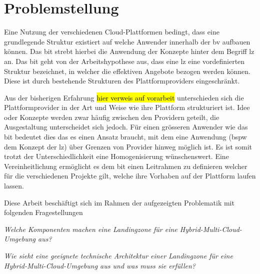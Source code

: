 \section{Problemstellung}

Eine Nutzung der verschiedenen Cloud-Plattformen bedingt, dass eine grundlegende Struktur existiert auf welche Anwender innerhalb der \ac{bv} aufbauen können. Das \ac{bit} strebt hierbei die Anwendung der Konzepte hinter dem Begriff \ac{lz} an. Das \ac{bit} geht von der Arbeitshypothese aus, dass eine \ac{lz} eine vordefinierten Struktur bezeichnet, in welcher die effektiven Angebote bezogen werden können. Diese ist durch bestehende Strukturen des Plattformproviders eingeschränkt.

Aus der bisherigen Erfahrung \hl{hier verweis auf vorarbeit} unterschieden sich die Plattformprovider in der Art und Weise wie ihre Plattform strukturiert ist. Idee oder Konzepte werden zwar häufig zwischen den Providern geteilt, die Ausgestaltung unterscheidet sich jedoch. Für einen grösseren Anwender wie das \ac{bit} bedeutet dies das es einen Ansatz braucht, mit dem eine Anwendung (bspw dem Konzept der \ac{lz}) über Grenzen von Provider hinweg möglich ist. Es ist somit trotzt der Unterschiedlichkeit eine Homogenisierung wünschenswert. Eine Vereinheitlichung ermöglicht es dem \ac{bit} einen Leitrahmen zu definieren welcher für die verschiedenen Projekte gilt, welche ihre Vorhaben auf der Plattform laufen lassen.

Diese Arbeit beschäftigt sich im Rahmen der aufgezeigten Problematik mit folgenden Fragestellungen

\textit{Welche Komponenten machen eine Landingzone für eine Hybrid-Multi-Cloud-Umgebung aus?}

\textit{Wie sieht eine geeignete technische Architektur einer Landingzone für eine Hybrid-Multi-Cloud-Umgebung aus und was muss sie erfüllen?}



